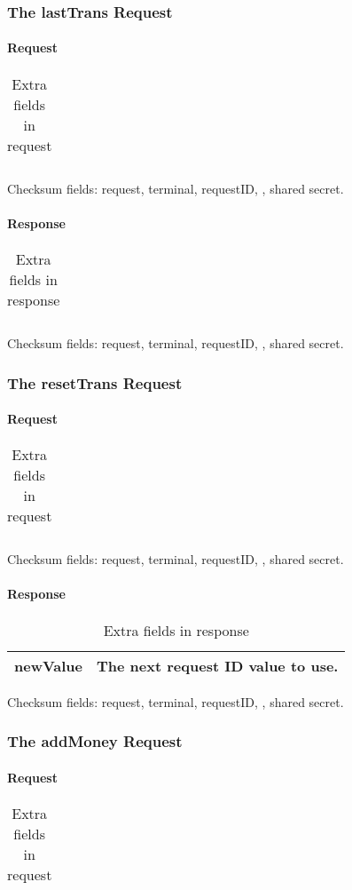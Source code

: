 \documentclass[a4paper,11pt]{article}
\newcommand{\code}[1]
   {\textsf{\mbox{#1}}}
\newcommand{\rightcellwidth}{25em}
\newcommand{\reqsection}[1]
    {\subsubsection{The \code{#1} Request}}
\newcommand{\partsection}[1]
           {\paragraph{#1}}
\begin{document}

\reqsection{lastTrans}

\partsection{Request}
\begin{table}[!ht]
  \begin{tabular}{|l|p{\rightcellwidth}|}
    \hline
       \\\hline
  \end{tabular} 
  \caption{Extra fields in \code{} request}
\end{table}

Checksum fields: request, terminal, requestID, , shared secret.

\partsection{Response}
\begin{table}[!ht]
  \begin{tabular}{|l|p{\rightcellwidth}|}
    \hline
       \\\hline
  \end{tabular} 
  \caption{Extra fields in \code{} response}
\end{table}

Checksum fields: request, terminal, requestID, , shared secret.


\reqsection{resetTrans}

\partsection{Request}
\begin{table}[!ht]
  \begin{tabular}{|l|p{\rightcellwidth}|}
    \hline
       \\\hline
  \end{tabular} 
  \caption{Extra fields in \code{} request}
\end{table}

Checksum fields: request, terminal, requestID, , shared secret.

\partsection{Response}
\begin{table}[!ht]
  \begin{tabular}{|l|p{\rightcellwidth}|}
    \hline
     newValue & The next request ID value to use.  \\\hline
  \end{tabular} 
  \caption{Extra fields in \code{} response}
\end{table}

Checksum fields: request, terminal, requestID, , shared secret.


\reqsection{addMoney}

\partsection{Request}
\begin{table}[!ht]
  \begin{tabular}{|l|p{\rightcellwidth}|}
    \hline
       \\\hline
  \end{tabular} 
  \caption{Extra fields in \code{} request}
\end{table}
\end{document}

